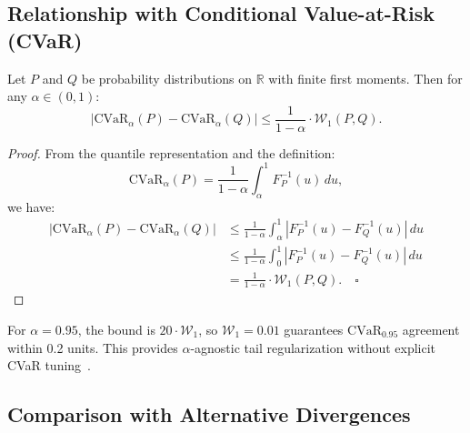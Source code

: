 \subsection{Relationship with Conditional Value-at-Risk (CVaR)}

\begin{proposition}
Let $P$ and $Q$ be probability distributions on $\mathbb{R}$ with finite first moments. Then for any $\alpha \in (0,1)$:
\begin{equation}
|\text{CVaR}_\alpha(P) - \text{CVaR}_\alpha(Q)|
\leq \frac{1}{1-\alpha} \cdot \mathcal{W}_1(P, Q).
\end{equation}
\end{proposition}

\begin{proof}
From the quantile representation and the definition:
\begin{equation}
\text{CVaR}_\alpha(P) = \frac{1}{1-\alpha} \int_{\alpha}^{1} F_P^{-1}(u) \, du,
\end{equation}
we have:
\begin{align}
|\text{CVaR}_\alpha(P) - \text{CVaR}_\alpha(Q)|
&\leq \frac{1}{1-\alpha} \int_{\alpha}^{1} |F_P^{-1}(u) - F_Q^{-1}(u)| \, du \nonumber \\
&\leq \frac{1}{1-\alpha} \int_{0}^{1} |F_P^{-1}(u) - F_Q^{-1}(u)| \, du \nonumber \\
&= \frac{1}{1-\alpha} \cdot \mathcal{W}_1(P, Q). \quad \square
\end{align}
\end{proof}

For $\alpha = 0.95$, the bound is $20 \cdot \mathcal{W}_1$, so $\mathcal{W}_1 = 0.01$ guarantees $\text{CVaR}_{0.95}$ agreement within 0.2 units. This provides $\alpha$-agnostic tail regularization without explicit CVaR tuning~\cite{chow2015cvar}.

\subsection{Comparison with Alternative Divergences}

